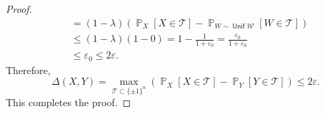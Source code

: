 \documentclass[letterpaper, reqno,11pt]{article}
\newcommand{\PP}{\mathop{{}\mathbb{P}}}
\DeclareMathOperator{\Unif}{\mathsf{Unif}}
\begin{document}
\begin{enumerate}
\begin{enumerate}
\begin{proof}
\begin{align*}
        &= (1 - \lambda) \left(\PP_X[X \in \mathcal T] - \PP_{W \sim \Unif \mathcal W}[W \in \mathcal T]\right) \\
        &\leq (1 - \lambda) (1 - 0) = 1 - \frac{1}{1 + \varepsilon_0} = \frac{\varepsilon_0}{1 + \varepsilon_0} \\
        &\leq \varepsilon_0 \leq 2\varepsilon.
      \end{align*}
      Therefore,
      $$ \Delta(X, Y) = \max_{\mathcal T \subset \{ \pm 1 \}^n} \left(\PP_X[X \in \mathcal T] - \PP_Y[Y \in \mathcal T]\right) \leq 2\varepsilon. $$
      This completes the proof.
    \end{proof}
  \end{enumerate}
\end{enumerate}
\end{document}
